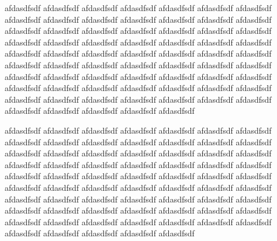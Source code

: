\documentclass[10pt]{sigplanconf}
\begin{document}
afdasdfsdf afdasdfsdf afdasdfsdf afdasdfsdf afdasdfsdf afdasdfsdf afdasdfsdf afdasdfsdf afdasdfsdf afdasdfsdf afdasdfsdf afdasdfsdf afdasdfsdf afdasdfsdf afdasdfsdf afdasdfsdf afdasdfsdf afdasdfsdf afdasdfsdf afdasdfsdf afdasdfsdf afdasdfsdf afdasdfsdf afdasdfsdf afdasdfsdf afdasdfsdf afdasdfsdf afdasdfsdf afdasdfsdf afdasdfsdf afdasdfsdf afdasdfsdf afdasdfsdf afdasdfsdf afdasdfsdf afdasdfsdf afdasdfsdf afdasdfsdf afdasdfsdf afdasdfsdf afdasdfsdf afdasdfsdf afdasdfsdf afdasdfsdf afdasdfsdf afdasdfsdf afdasdfsdf afdasdfsdf afdasdfsdf afdasdfsdf afdasdfsdf afdasdfsdf afdasdfsdf afdasdfsdf afdasdfsdf afdasdfsdf afdasdfsdf afdasdfsdf afdasdfsdf afdasdfsdf afdasdfsdf afdasdfsdf afdasdfsdf afdasdfsdf afdasdfsdf afdasdfsdf afdasdfsdf afdasdfsdf 

afdasdfsdf afdasdfsdf afdasdfsdf afdasdfsdf afdasdfsdf afdasdfsdf afdasdfsdf afdasdfsdf afdasdfsdf afdasdfsdf afdasdfsdf afdasdfsdf afdasdfsdf afdasdfsdf afdasdfsdf afdasdfsdf afdasdfsdf afdasdfsdf afdasdfsdf afdasdfsdf afdasdfsdf afdasdfsdf afdasdfsdf afdasdfsdf afdasdfsdf afdasdfsdf afdasdfsdf afdasdfsdf afdasdfsdf afdasdfsdf afdasdfsdf afdasdfsdf afdasdfsdf afdasdfsdf afdasdfsdf afdasdfsdf afdasdfsdf afdasdfsdf afdasdfsdf afdasdfsdf afdasdfsdf afdasdfsdf afdasdfsdf afdasdfsdf afdasdfsdf afdasdfsdf afdasdfsdf afdasdfsdf afdasdfsdf afdasdfsdf afdasdfsdf afdasdfsdf afdasdfsdf afdasdfsdf afdasdfsdf afdasdfsdf afdasdfsdf afdasdfsdf afdasdfsdf afdasdfsdf afdasdfsdf afdasdfsdf afdasdfsdf afdasdfsdf afdasdfsdf afdasdfsdf afdasdfsdf afdasdfsdf 
\end{document}
